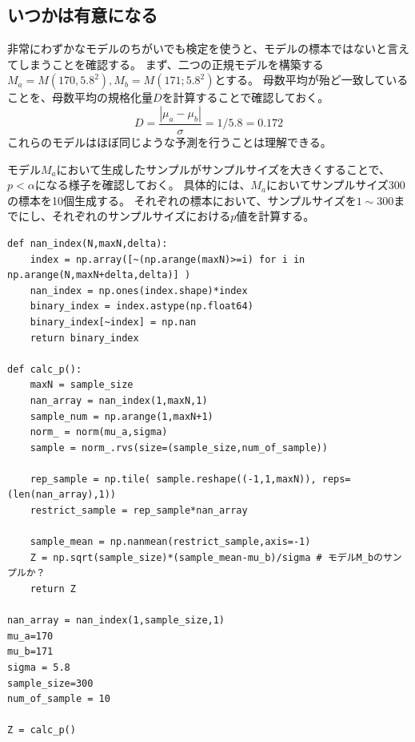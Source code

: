 \subsection{いつかは有意になる}\label{large_sample_size_significant}
非常にわずかなモデルのちがいでも検定を使うと、モデルの標本ではないと言えてしまうことを確認する。
まず、二つの正規モデルを構築する$M_a=M(170,5.8^2),M_b=M(171;5.8^2)$とする。
母数平均が殆ど一致していることを、母数平均の規格化量$D$を計算することで確認しておく。
\begin{equation*}
 D=\frac{|\mu_a-\mu_b|}{\sigma} = 1/5.8=0.172
\end{equation*}
これらのモデルはほぼ同じような予測を行うことは理解できる。

モデル$M_a$において生成したサンプルがサンプルサイズを大きくすることで、$p<\alpha$になる様子を確認しておく。
具体的には、$M_a$においてサンプルサイズ$300$の標本を10個生成する。
それぞれの標本において、サンプルサイズを$1\sim 300$までにし、それぞれのサンプルサイズにおける$p$値を計算する。

\begin{lstlisting}
def nan_index(N,maxN,delta):
    index = np.array([~(np.arange(maxN)>=i) for i in np.arange(N,maxN+delta,delta)] )
    nan_index = np.ones(index.shape)*index
    binary_index = index.astype(np.float64)
    binary_index[~index] = np.nan
    return binary_index

def calc_p():
    maxN = sample_size
    nan_array = nan_index(1,maxN,1)
    sample_num = np.arange(1,maxN+1)
    norm_ = norm(mu_a,sigma)
    sample = norm_.rvs(size=(sample_size,num_of_sample))

    rep_sample = np.tile( sample.reshape((-1,1,maxN)), reps= (len(nan_array),1))
    restrict_sample = rep_sample*nan_array

    sample_mean = np.nanmean(restrict_sample,axis=-1)
    Z = np.sqrt(sample_size)*(sample_mean-mu_b)/sigma # モデルM_bのサンプルか？
    return Z

nan_array = nan_index(1,sample_size,1)
mu_a=170
mu_b=171
sigma = 5.8
sample_size=300
num_of_sample = 10

Z = calc_p()
\end{lstlisting}

